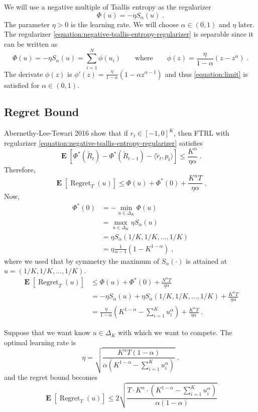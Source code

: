 \documentclass[12pt]{article}
\DeclareMathOperator{\Regret}{Regret}
\DeclareMathOperator{\Exp}{\mathbf{E}}
\begin{document}
We will use a negative multiple of Tsallis entropy as the regularizer
\begin{equation}
\label{equation:negative-tsallis-entropy-regularizer}
\Phi(u) = - \eta S_\alpha(u) \; .
\end{equation}
The parameter $\eta > 0$ is the learning rate. We will choose $\alpha \in (0,1)$
and $\eta$ later. The regularizer \eqref{equation:negative-tsallis-entropy-regularizer}
is separable since it can be written as
$$
\Phi(u) = - \eta S_\alpha(u) = \sum_{i=1}^N \phi(u_i)
\qquad \text{where} \qquad
\phi(z) = \frac{\eta}{1 - \alpha} \left( z - z^\alpha \right) \; .
$$
The derivate $\phi(z)$ is $\phi'(z) = \frac{\eta}{1-\alpha}\left(1 - \alpha z^{\alpha - 1} \right)$
and thus \eqref{equation:limit} is satisfied for $\alpha \in (0,1)$.

\subsection{Regret Bound}

Abernethy-Lee-Tewari 2016 show that if $r_t \in [-1,0]^K$, then FTRL with regularizer
\eqref{equation:negative-tsallis-entropy-regularizer} satisfies
$$
\Exp\left[\Phi^* \left(\widetilde R_t\right) - \Phi^*\left(\widetilde R_{t-1}\right) - \langle \widetilde r_t, p_t \rangle \right] \le \frac{K^\alpha}{\eta \alpha} \; .
$$
Therefore,
$$
\Exp[\Regret_T(u)] \le \Phi(u) + \Phi^*(0) + \frac{K^\alpha T}{\eta \alpha} \; .
$$
Now,
\begin{align*}
\Phi^*(0)
& = - \min_{u \in \Delta_K} \Phi(u) \\
& = \max_{u \in \Delta_K} \eta S_\alpha(u) \\
& = \eta S_\alpha(1/K, 1/K, \dots, 1/K) \\
& = \eta \frac{1}{\alpha - 1} \left(1 - K^{1-\alpha} \right) \; ,
\end{align*}
where we used that by symmetry the maximum of $S_\alpha(\cdot)$ is attained at
$u = (1/K, 1/K, \dots, 1/K)$.
\begin{align*}
\Exp[\Regret_T(u)]
& \le \Phi(u) + \Phi^*(0) + \frac{N^\alpha T}{\eta \alpha} \\
& = - \eta S_\alpha(u) + \eta S_\alpha(1/K, 1/K, \dots, 1/K) + \frac{K^\alpha T}{\eta \alpha} \\
& = \frac{\eta}{1 - \alpha} \left(K^{1-\alpha} - \sum_{i=1}^K u_i^\alpha \right) + \frac{K^\alpha T}{\eta \alpha} \; .
\end{align*}

Suppose that we want know $u \in \Delta_K$ with which we want to compete.
The optimal learning rate is
$$
\eta = \sqrt{\frac{K^\alpha T (1-\alpha)}{\alpha (K^{1-\alpha} - \sum_{i=1}^K u_i^\alpha)}} \; .
$$
and the regret bound becomes
$$
\Exp[\Regret_T(u)]
\le 2\sqrt{\frac{T \cdot K^\alpha \cdot \left( K^{1-\alpha} - \sum_{i=1}^K u_i^\alpha \right) }{\alpha (1-\alpha)}}
$$
\end{document}
